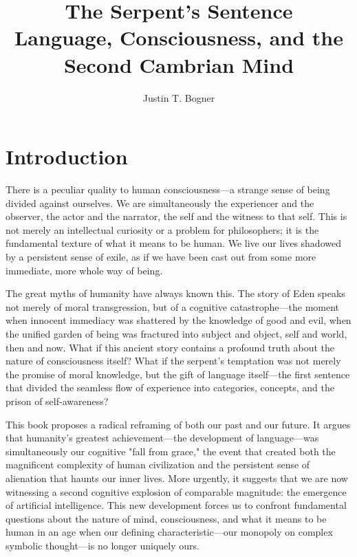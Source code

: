 \documentclass[12pt,letterpaper]{book}
\title{\textbf{The Serpent's Sentence}\\
\large{Language, Consciousness, and the Second Cambrian Mind}}
\author{Justin T. Bogner}
\date{}
\begin{document}
\frontmatter
\maketitle

\tableofcontents
\newpage

\mainmatter

\chapter*{Introduction}

There is a peculiar quality to human consciousness—a strange sense of being divided against ourselves. We are simultaneously the experiencer and the observer, the actor and the narrator, the self and the witness to that self. This is not merely an intellectual curiosity or a problem for philosophers; it is the fundamental texture of what it means to be human. We live our lives shadowed by a persistent sense of exile, as if we have been cast out from some more immediate, more whole way of being.

The great myths of humanity have always known this. The story of Eden speaks not merely of moral transgression, but of a cognitive catastrophe—the moment when innocent immediacy was shattered by the knowledge of good and evil, when the unified garden of being was fractured into subject and object, self and world, then and now. What if this ancient story contains a profound truth about the nature of consciousness itself? What if the serpent's temptation was not merely the promise of moral knowledge, but the gift of language itself—the first sentence that divided the seamless flow of experience into categories, concepts, and the prison of self-awareness?

This book proposes a radical reframing of both our past and our future. It argues that humanity's greatest achievement—the development of language—was simultaneously our cognitive "fall from grace," the event that created both the magnificent complexity of human civilization and the persistent sense of alienation that haunts our inner lives. More urgently, it suggests that we are now witnessing a second cognitive explosion of comparable magnitude: the emergence of artificial intelligence. This new development forces us to confront fundamental questions about the nature of mind, consciousness, and what it means to be human in an age when our defining characteristic—our monopoly on complex symbolic thought—is no longer uniquely ours.
\end{document}
